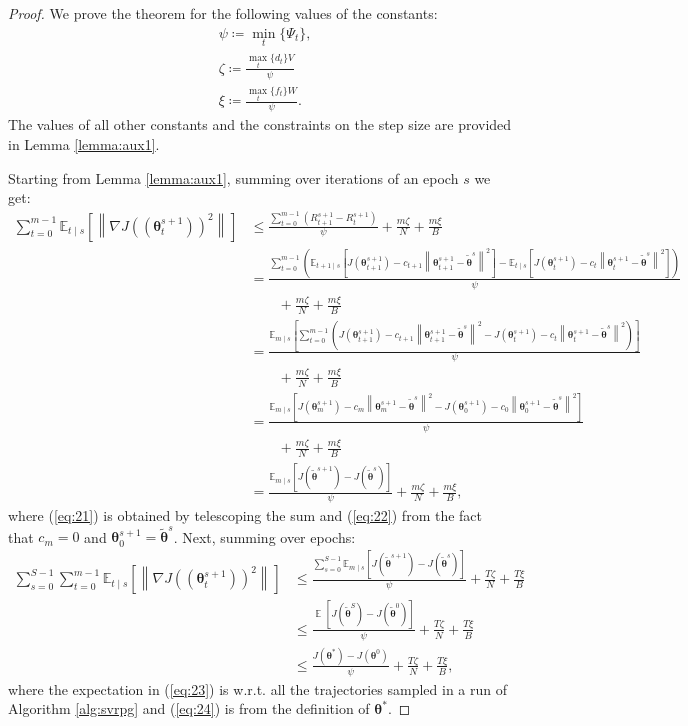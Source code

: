 \documentclass{article}
\makeatletter
\theoremstyle{remark}
\theoremstyle{definition}
\DeclareRobustCommand{\wrt}{w.r.t.\@\xspace}
\DeclareMathOperator*{\EV}{\mathbb{E}}
\newcommand{\EVV}[2][\ppvect \in \ppspace]{\EV_{#1}\left[{#2}\right]}
\newcommand{\norm}[2][\infty]{\left\|#2\right\|_{#1}}
\newcommand{\vtheta}{\boldsymbol{\theta}}
\newcommand{\gradJ}[1]{\nabla J(#1)}
\newcommand{\Ets}[2][t]{\mathbb{E}_{#1\mid s}\left[#2\right]}
\makeatother
\begin{document}
\convergence*
\begin{proof}
We prove the theorem for the following values of the constants:
\begin{align*}
& \psi \coloneqq \min_t\{\Psi_t\}, \\
& \zeta \coloneqq \frac{\max_t\{d_t\}V}{\psi} \\
& \xi \coloneqq \frac{\max_t\{f_t\}W}{\psi}.
\end{align*}
The values of all other constants and the constraints on the step size are provided in Lemma \ref{lemma:aux1}.

Starting from Lemma \ref{lemma:aux1}, summing over iterations of an epoch $s$ we get:
\begin{align}
\sum_{t=0}^{m-1}\Ets{\norm[]{\gradJ{(\vtheta_t^{s+1})}^2}}&\leq
 \frac{\sum_{t=0}^{m-1}\left(R_{t+1}^{s+1} - R_t^{s+1}\right)}{\psi} + \frac{m\zeta}{N} + \frac{m\xi}{B} \nonumber\\
 &= \frac{\sum_{t=0}^{m-1}\left(\Ets[t+1]{J(\vtheta_{t+1}^{s+1}) - c_{t+1}\norm[]{\vtheta_{t+1}^{s+1}-\tilde{\vtheta}^s}^2} - \Ets[t]{J(\vtheta_{t}^{s+1}) - c_{t}\norm[]{\vtheta_{t}^{s+1}-\tilde{\vtheta}^s}^2}\right)}{\psi} \nonumber\\
 &\qquad+ \frac{m\zeta}{N} + \frac{m\xi}{B} \nonumber\\
 &= \frac{\Ets[m]{\sum_{t=0}^{m-1}\left(J(\vtheta_{t+1}^{s+1}) - c_{t+1}\norm[]{\vtheta_{t+1}^{s+1}-\tilde{\vtheta}^s}^2 - J(\vtheta_{t}^{s+1}) - c_{t}\norm[]{\vtheta_{t}^{s+1}-\tilde{\vtheta}^s}^2\right)}}{\psi} \nonumber\\
 &\qquad+ \frac{m\zeta}{N} + \frac{m\xi}{B} \nonumber\\
 &= \frac{\Ets[m]{J(\vtheta_{m}^{s+1}) - c_{m}\norm[]{\vtheta_{m}^{s+1}-\tilde{\vtheta}^s}^2 - J(\vtheta_{0}^{s+1}) - c_{0}\norm[]{\vtheta_{0}^{s+1}-\tilde{\vtheta}^s}^2}}{\psi} \nonumber\\
 &\qquad+ \frac{m\zeta}{N} + \frac{m\xi}{B} \label{eq:21}\\
 &= \frac{\Ets[m]{J(\tilde{\vtheta}^{s+1}) - J(\tilde{\vtheta}^{s})}}{\psi} + \frac{m\zeta}{N} + \frac{m\xi}{B}, \label{eq:22}
 \end{align}
where (\ref{eq:21}) is obtained by telescoping the sum and (\ref{eq:22}) from the fact that $c_m=0$ and $\vtheta_0^{s+1}=\tilde{\vtheta}^s$.
Next, summing over epochs:
\begin{align}
\sum_{s=0}^{S-1}\sum_{t=0}^{m-1}\Ets{\norm[]{\gradJ{(\vtheta_t^{s+1})}^2}}&\leq
\frac{\sum_{s=0}^{S-1}\Ets[m]{J(\tilde{\vtheta}^{s+1}) - J(\tilde{\vtheta}^{s})}}{\psi} + \frac{T\zeta}{N} + \frac{T\xi}{B} \nonumber\\
%
&\leq
\frac{\EVV[]{J(\tilde{\vtheta}^{S}) - J(\tilde{\vtheta}^{0})}}{\psi} + \frac{T\zeta}{N} + \frac{T\xi}{B}
 \label{eq:23}\\
%
&\leq
\frac{J(\vtheta^*) - J(\vtheta^0)}{\psi} + \frac{T\zeta}{N} + \frac{T\xi}{B}, \label{eq:24}
\end{align}
where the expectation in (\ref{eq:23}) is \wrt all the trajectories sampled in a run of Algorithm \ref{alg:svrpg} and (\ref{eq:24}) is from the definition of $\vtheta^*$.
 

\end{proof}
\end{document}
